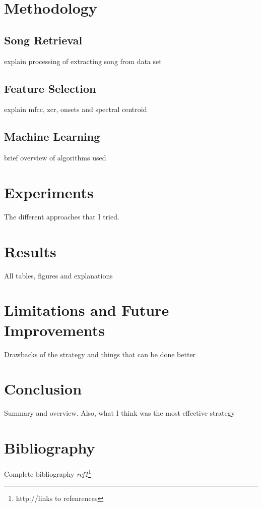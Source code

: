 \documentclass[11pt]{article}
\begin{document}
\section{Methodology}
\subsection{Song Retrieval}
explain processing of extracting song from data set
\newpage

\subsection{Feature Selection}
explain mfcc, zcr, onsets and spectral centroid
\newpage

\subsection{Machine Learning}
brief overview of algorithms used
\newpage

\newpage
\section{Experiments}
The different approaches that I tried.
\newpage
\section{Results}
All tables, figures and explanations

\newpage

\section{Limitations and Future Improvements}
Drawbacks of the strategy and things that can be done better
\newpage

\section{Conclusion}
Summary and overview. Also, what I think was the most effective strategy
\newpage

\section{Bibliography}
Complete bibliography
\emph{ref1}\footnote{http://links to refenrences } 
\end{document}

